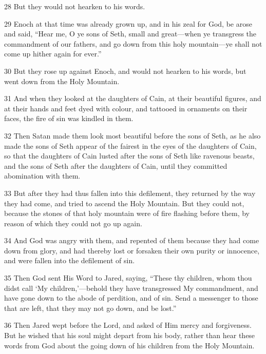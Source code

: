 \par 28 But they would not hearken to his words.

\par 29 Enoch at that time was already grown up, and in his zeal for God, be arose and said, “Hear me, O ye sons of Seth, small and great—when ye transgress the commandment of our fathers, and go down from this holy mountain—ye shall not come up hither again for ever.”

\par 30 But they rose up against Enoch, and would not hearken to his words, but went down from the Holy Mountain.

\par 31 And when they looked at the daughters of Cain, at their beautiful figures, and at their hands and feet dyed with colour, and tattooed in ornaments on their faces, the fire of sin was kindled in them.

\par 32 Then Satan made them look most beautiful before the sons of Seth, as he also made the sons of Seth appear of the fairest in the eyes of the daughters of Cain, so that the daughters of Cain lusted after the sons of Seth like ravenous beasts, and the sons of Seth after the daughters of Cain, until they committed abomination with them.

\par 33 But after they had thus fallen into this defilement, they returned by the way they had come, and tried to ascend the Holy Mountain. But they could not, because the stones of that holy mountain were of fire flashing before them, by reason of which they could not go up again.

\par 34 And God was angry with them, and repented of them because they had come down from glory, and had thereby lost or forsaken their own purity or innocence, and were fallen into the defilement of sin.

\par 35 Then God sent His Word to Jared, saying, “These thy children, whom thou didst call ‘My children,’—behold they have transgressed My commandment, and have gone down to the abode of perdition, and of sin. Send a messenger to those that are left, that they may not go down, and be lost.”

\par 36 Then Jared wept before the Lord, and asked of Him mercy and forgiveness. But he wished that his soul might depart from his body, rather than hear these words from God about the going down of his children from the Holy Mountain.


